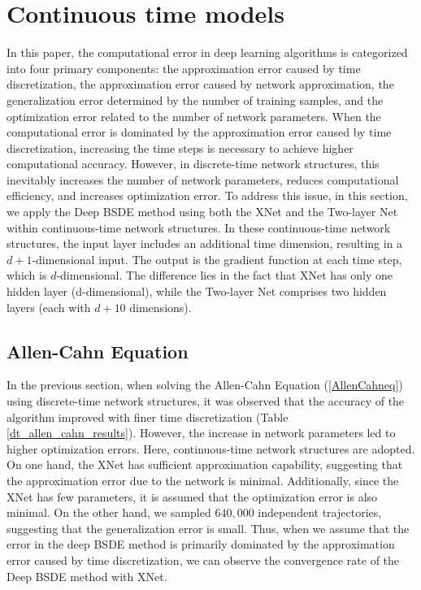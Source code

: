 \documentclass[11pt]{article}
\begin{document}
\section{Continuous time models}\label{s5}
In this paper, the computational error in deep learning algorithms is categorized into four primary components: the approximation error caused by time discretization, the approximation error caused by network approximation, the generalization error determined by the number of training samples, and the optimization error related to the number of network parameters. When the computational error is dominated by the approximation error caused by time discretization, increasing the time steps is necessary to achieve higher computational accuracy. However, in discrete-time network structures, this inevitably increases the number of network parameters, reduces computational efficiency, and increases optimization error.
To address this issue, in this section, we apply the Deep BSDE method using both the XNet and the Two-layer Net within continuous-time network structures. In these continuous-time network structures, the input layer includes an additional time dimension, resulting in a $d+1$-dimensional input. The output is the gradient function at each time step, which is $d$-dimensional. The difference lies in the fact that XNet has only one hidden layer (d-dimensional), while the Two-layer Net comprises two hidden layers (each with $d+10$ dimensions).

\subsection{Allen-Cahn Equation}
In the previous section, when solving the Allen-Cahn Equation (\ref{AllenCahneq}) using discrete-time network structures, it was observed that the accuracy of the algorithm improved with finer time discretization (Table \ref{dt_allen_cahn_results}). However, the increase in network parameters led to higher optimization errors. Here, continuous-time network structures are adopted. On one hand, the XNet has sufficient approximation capability, suggesting that the approximation error due to the network is minimal. Additionally, since the XNet has few parameters, it is assumed that the optimization error is also minimal. On the other hand, we sampled $640,000$ independent trajectories, suggesting that the generalization error is small.
Thus, when we assume that the error in the deep BSDE method is primarily dominated by the approximation error caused by time discretization, we can observe the convergence rate \textsuperscript{\cite{Quarteroni_A}} of the Deep BSDE method with XNet.
\end{document}
